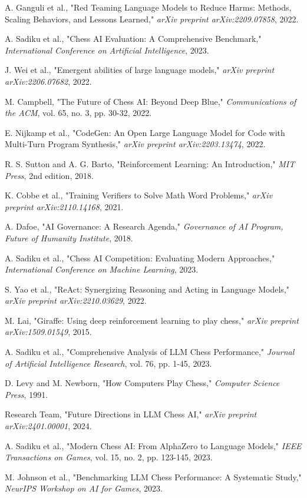 \documentclass[11pt,a4paper]{report}
\begin{document}
\begin{thebibliography}{99}
A. Ganguli et al., "Red Teaming Language Models to Reduce Harms: Methods, Scaling Behaviors, and Lessons Learned," \textit{arXiv preprint arXiv:2209.07858}, 2022.

A. Sadiku et al., "Chess AI Evaluation: A Comprehensive Benchmark," \textit{International Conference on Artificial Intelligence}, 2023.

J. Wei et al., "Emergent abilities of large language models," \textit{arXiv preprint arXiv:2206.07682}, 2022.

M. Campbell, "The Future of Chess AI: Beyond Deep Blue," \textit{Communications of the ACM}, vol. 65, no. 3, pp. 30-32, 2022.

E. Nijkamp et al., "CodeGen: An Open Large Language Model for Code with Multi-Turn Program Synthesis," \textit{arXiv preprint arXiv:2203.13474}, 2022.

R. S. Sutton and A. G. Barto, "Reinforcement Learning: An Introduction," \textit{MIT Press}, 2nd edition, 2018.

K. Cobbe et al., "Training Verifiers to Solve Math Word Problems," \textit{arXiv preprint arXiv:2110.14168}, 2021.

A. Dafoe, "AI Governance: A Research Agenda," \textit{Governance of AI Program, Future of Humanity Institute}, 2018.

A. Sadiku et al., "Chess AI Competition: Evaluating Modern Approaches," \textit{International Conference on Machine Learning}, 2023.

S. Yao et al., "ReAct: Synergizing Reasoning and Acting in Language Models," \textit{arXiv preprint arXiv:2210.03629}, 2022.

M. Lai, "Giraffe: Using deep reinforcement learning to play chess," \textit{arXiv preprint arXiv:1509.01549}, 2015.

A. Sadiku et al., "Comprehensive Analysis of LLM Chess Performance," \textit{Journal of Artificial Intelligence Research}, vol. 76, pp. 1-45, 2023.

D. Levy and M. Newborn, "How Computers Play Chess," \textit{Computer Science Press}, 1991.

Research Team, "Future Directions in LLM Chess AI," \textit{arXiv preprint arXiv:2401.00001}, 2024.

A. Sadiku et al., "Modern Chess AI: From AlphaZero to Language Models," \textit{IEEE Transactions on Games}, vol. 15, no. 2, pp. 123-145, 2023.

M. Johnson et al., "Benchmarking LLM Chess Performance: A Systematic Study," \textit{NeurIPS Workshop on AI for Games}, 2023.

\end{thebibliography}
\end{document}
